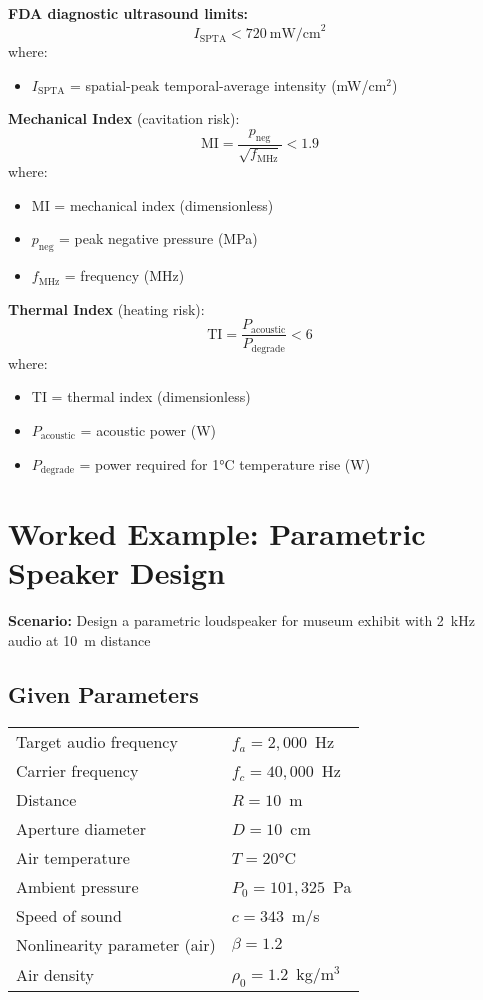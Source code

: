 \textbf{FDA diagnostic ultrasound limits:}
\begin{equation}
I_{\text{SPTA}} < 720~\text{mW/cm}^2
\end{equation}
where:
\begin{itemize}
\item $I_{\text{SPTA}}$ = spatial-peak temporal-average intensity (mW/cm$^2$)
\end{itemize}

\textbf{Mechanical Index} (cavitation risk):
\begin{equation}
\text{MI} = \frac{p_{\text{neg}}}{\sqrt{f_{\text{MHz}}}} < 1.9
\end{equation}
where:
\begin{itemize}
\item MI = mechanical index (dimensionless)
\item $p_{\text{neg}}$ = peak negative pressure (MPa)
\item $f_{\text{MHz}}$ = frequency (MHz)
\end{itemize}

\textbf{Thermal Index} (heating risk):
\begin{equation}
\text{TI} = \frac{P_{\text{acoustic}}}{P_{\text{degrade}}} < 6
\end{equation}
where:
\begin{itemize}
\item TI = thermal index (dimensionless)
\item $P_{\text{acoustic}}$ = acoustic power (W)
\item $P_{\text{degrade}}$ = power required for 1°C temperature rise (W)
\end{itemize}

\section{Worked Example: Parametric Speaker Design}

\textbf{Scenario:} Design a parametric loudspeaker for museum exhibit with 2~kHz audio at 10~m distance

\subsection*{Given Parameters}

\begin{tabular}{@{}ll@{}}
Target audio frequency & $f_a = 2{,}000$~Hz \\
Carrier frequency & $f_c = 40{,}000$~Hz \\
Distance & $R = 10$~m \\
Aperture diameter & $D = 10$~cm \\
Air temperature & $T = 20$°C \\
Ambient pressure & $P_0 = 101{,}325$~Pa \\
Speed of sound & $c = 343$~m/s \\
Nonlinearity parameter (air) & $\beta = 1.2$ \\
Air density & $\rho_0 = 1.2$~kg/m$^3$ \\
\end{tabular}

